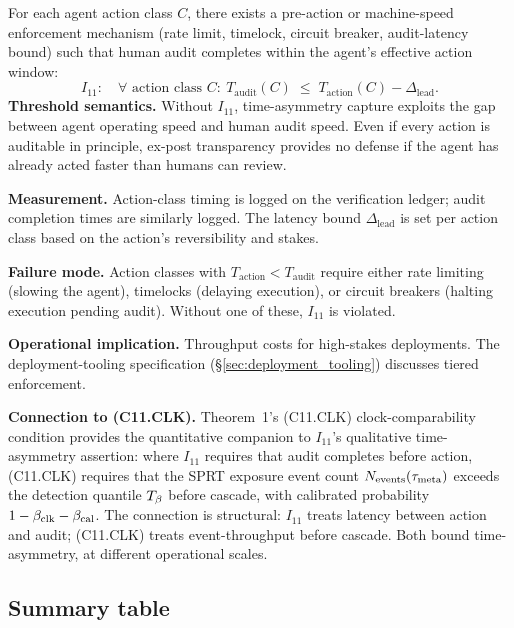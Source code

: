 \begin{definition}
\label{inv:I11}
For each agent action class $C$, there exists a pre-action or
machine-speed enforcement mechanism (rate limit, timelock, circuit
breaker, audit-latency bound) such that human audit completes
within the agent's effective action window:
\[
  I_{11}: \quad \forall \text{ action class } C:\
  T_{\mathrm{audit}}(C) \;\leq\; T_{\mathrm{action}}(C) - \Delta_{\mathrm{lead}}.
\]
\textbf{Threshold semantics.} Without $I_{11}$, time-asymmetry capture exploits
    the gap between agent operating speed and human audit speed. Even if every
    action is auditable in principle, ex-post transparency provides no defense
    if the agent has already acted faster than humans can review.

\textbf{Measurement.} Action-class timing is logged on the verification ledger;
    audit completion times are similarly logged. The latency bound
    $\Delta_{\mathrm{lead}}$ is set per action class based on the action's
    reversibility and stakes.

\textbf{Failure mode.} Action classes with $T_{\mathrm{action}} <
    T_{\mathrm{audit}}$ require either rate limiting (slowing the agent),
    timelocks (delaying execution), or circuit breakers (halting execution
    pending audit). Without one of these, $I_{11}$ is violated.

\textbf{Operational implication.} Throughput costs for high-stakes deployments.
    The deployment-tooling specification (\S\ref{sec:deployment_tooling})
    discusses tiered enforcement.

\textbf{Connection to (C11.CLK).}  Theorem~1's (C11.CLK) clock-comparability
    condition provides the quantitative companion to $I_{11}$'s qualitative
    time-asymmetry assertion: where $I_{11}$ requires that audit completes
    before action, (C11.CLK) requires that the SPRT exposure event count
    $N_{\mathrm{events}}(\tau_{\mathrm{meta}})$ exceeds the detection quantile $T_{\beta}$ before
    cascade, with calibrated probability $1 - \beta_{\mathrm{clk}} - \beta_{\mathrm{cal}}$.  The connection
    is structural: $I_{11}$ treats latency between action and audit; (C11.CLK)
    treats event-throughput before cascade.  Both bound time-asymmetry, at
    different operational scales.
\end{definition}

\subsection{Summary table}
\label{sec:invariants_table}

